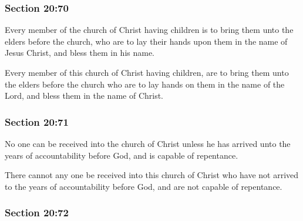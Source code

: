 	\subsubsection{Section 20:70} %
		\label{DC20-70}

		Every member of the church of Christ having children is to bring them unto the elders before the church, who are to lay their hands upon them in the name of Jesus Christ, and bless them in his name.

		\begin{framed}
		\scriptsize
			\begin{compactdesc}
				\item[JSP] Every member of this church of Christ having children, are to bring them unto the elders before the church who are to lay hands on them in the name of the Lord, and bless them in the name of Christ. 
				\item[RB1] 
				\item[BC] 
			\end{compactdesc}
		\end{framed}

	\subsubsection{Section 20:71} %
		\label{DC20-71}

		No one can be received into the church of Christ unless he has arrived unto the years of accountability before God, and is capable of repentance.

		\begin{framed}
		\scriptsize
			\begin{compactdesc}
				\item[JSP] There cannot any one be received into this church of Christ who have not arrived to the years of accountability before God, and are not capable of repentance. 
				\item[RB1] 
				\item[BC] 
			\end{compactdesc}
		\end{framed}

	\subsubsection{Section 20:72} %
		\label{DC20-72}

